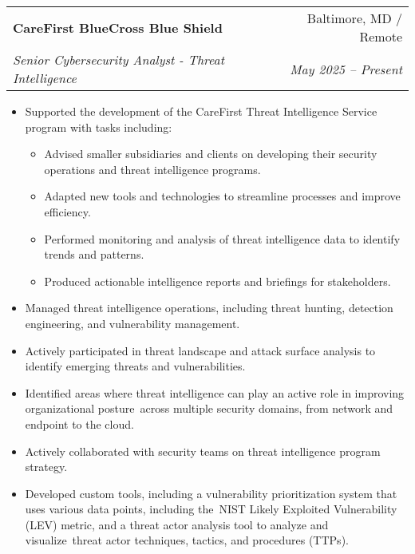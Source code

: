 \documentclass[letterpaper,11pt]{article}
\makeatletter
\newcommand{\resumeSubheading}[4]{
  \vspace{-1pt}\item
    \begin{tabular*}{0.97\textwidth}[t]{l@{\extracolsep{\fill}}r}
      \textbf{#1} & #2 \\
      \textit{\small#3} & \textit{\small #4} \\
    \end{tabular*}\vspace{-5pt}
}
\newcommand{\resumeItemListStart}{\begin{itemize}[nosep]}
\newcommand{\resumeItemListEnd}{\end{itemize}\vspace{-5pt}}
\makeatother
\begin{document}
\resumeSubheading
{CareFirst BlueCross Blue Shield}{Baltimore, MD / Remote}
{Senior Cybersecurity Analyst - Threat Intelligence}{May 2025 -- Present}
\resumeItemListStart
\item Supported the development of the CareFirst Threat Intelligence Service program with tasks including:
\begin{itemize}[nosep]
  \item Advised smaller subsidiaries and clients on developing their security operations and threat intelligence programs.
  \item Adapted new tools and technologies to streamline processes and improve efficiency.
  \item Performed monitoring and analysis of threat intelligence data to identify trends and patterns.
  \item Produced actionable intelligence reports and briefings for stakeholders.
\end{itemize}
\item Managed threat intelligence operations, including threat hunting, detection engineering, and vulnerability management.
\item Actively participated in threat landscape and attack surface analysis to identify emerging threats and vulnerabilities.
\item Identified areas where threat intelligence can play an active role in improving organizational posture\
across multiple security domains, from network and endpoint to the cloud.
\item Actively collaborated with security teams on threat intelligence program strategy.
\item Developed custom tools, including a vulnerability prioritization system that uses various data points, including the\
NIST Likely Exploited Vulnerability (LEV) metric, and a threat actor analysis tool to analyze and visualize\
threat actor techniques, tactics, and procedures (TTPs).
\resumeItemListEnd
\end{document}
